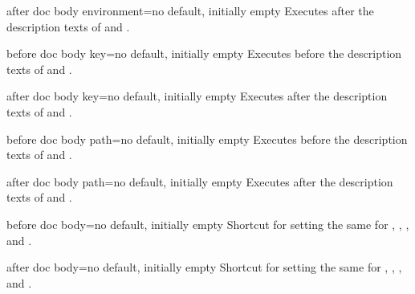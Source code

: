 \begin{docTcbKey}[][doc new=2015-10-09]{after doc body environment}{=}{no default, initially empty}
  Executes  after the description texts
  of  and .
\end{docTcbKey}


\begin{docTcbKey}[][doc new=2015-10-09]{before doc body key}{=}{no default, initially empty}
  Executes  before the description texts
  of  and .
\end{docTcbKey}

\begin{docTcbKey}[][doc new=2015-10-09]{after doc body key}{=}{no default, initially empty}
  Executes  after the description texts
  of  and .
\end{docTcbKey}

\clearpage

\begin{docTcbKey}[][doc new=2019-09-18]{before doc body path}{=}{no default, initially empty}
  Executes  before the description texts
  of  and .
\end{docTcbKey}

\begin{docTcbKey}[][doc new=2019-09-18]{after doc body path}{=}{no default, initially empty}
  Executes  after the description texts
  of  and .
\end{docTcbKey}


\begin{docTcbKey}[][doc new and updated={2015-10-09}{2019-09-18}]{before doc body}{=}{no default, initially empty}
  Shortcut for setting the same  for
  , ,
  , and .
\end{docTcbKey}

\begin{docTcbKey}[][doc new and updated={2015-10-09}{2019-09-18}]{after doc body}{=}{no default, initially empty}
  Shortcut for setting the same  for
  , ,
  , and .
\end{docTcbKey}







